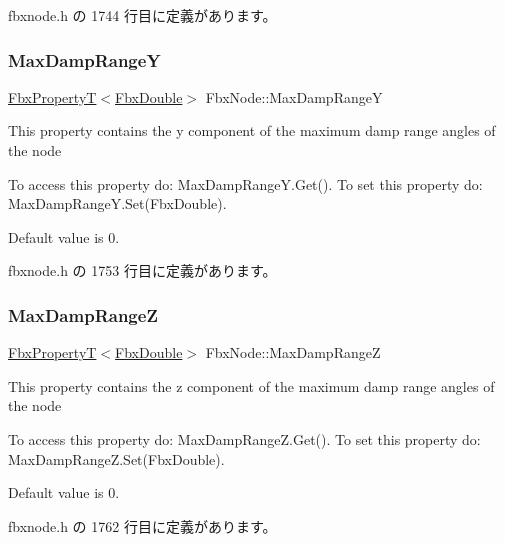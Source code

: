  fbxnode.\+h の 1744 行目に定義があります。

\mbox{\label{class_fbx_node_ad4259eb8b56aab70de11311ce28f1ccf}} 
\subsubsection{\texorpdfstring{Max\+Damp\+RangeY}{MaxDampRangeY}}
{\footnotesize\ttfamily \hyperlink{class_fbx_property_t}{Fbx\+PropertyT}$<$\hyperlink{fbxtypes_8h_a171e72a1c46fc15c1a6c9c31948c1c5b}{Fbx\+Double}$>$ Fbx\+Node\+::\+Max\+Damp\+RangeY}

This property contains the y component of the maximum damp range angles of the node

To access this property do\+: Max\+Damp\+Range\+Y.\+Get(). To set this property do\+: Max\+Damp\+Range\+Y.\+Set(\+Fbx\+Double).

Default value is 0. 

 fbxnode.\+h の 1753 行目に定義があります。

\mbox{\label{class_fbx_node_a29e4e0946b14c49abab84c3ec7bc0a1a}} 
\subsubsection{\texorpdfstring{Max\+Damp\+RangeZ}{MaxDampRangeZ}}
{\footnotesize\ttfamily \hyperlink{class_fbx_property_t}{Fbx\+PropertyT}$<$\hyperlink{fbxtypes_8h_a171e72a1c46fc15c1a6c9c31948c1c5b}{Fbx\+Double}$>$ Fbx\+Node\+::\+Max\+Damp\+RangeZ}

This property contains the z component of the maximum damp range angles of the node

To access this property do\+: Max\+Damp\+Range\+Z.\+Get(). To set this property do\+: Max\+Damp\+Range\+Z.\+Set(\+Fbx\+Double).

Default value is 0. 

 fbxnode.\+h の 1762 行目に定義があります。

\mbox{\label{class_fbx_node_af76542d55cf747b4d133d9b4d2e703f7}} 
